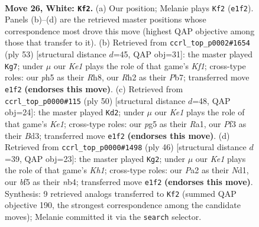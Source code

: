 \documentclass[11pt]{article}
\begin{document}
\clearpage

\begin{figure}[p]\centering
\begin{subfigure}{0.46\textwidth}\centering
\resizebox{\linewidth}{!}{%
\newchessgame
\chessboard[
  setfen={r1k3nN/3n4/8/pp2pbpp/8/5P1P/P5PR/2b1K3 w - - 0 26},
  showmover=false,
  pgfstyle=straightmove, color=movearrow, markmove={e1-f2}
]}
\caption{}
\end{subfigure}\hfill
\begin{subfigure}{0.46\textwidth}\centering
\resizebox{\linewidth}{!}{%
\newchessgame
\chessboard[
  setfen={5k1r/1p1Ppp2/p1p5/2P4p/2B2b2/7P/PPK2P2/7R b - - 1 27},
  showmover=false,
  pgfstyle=straightmove, color=movearrow, markmove={f8-g7}
]}
\caption{}
\end{subfigure}
\\[4pt]
\begin{subfigure}{0.46\textwidth}\centering
\resizebox{\linewidth}{!}{%
\newchessgame
\chessboard[
  setfen={r4b2/2k2p2/2p2p1p/p1P5/P1NP4/3BP2b/8/R3K3 w Q - 1 26},
  showmover=false,
  pgfstyle=straightmove, color=movearrow, markmove={e1-d2}
]}
\caption{}
\end{subfigure}\hfill
\begin{subfigure}{0.46\textwidth}\centering
\resizebox{\linewidth}{!}{%
\newchessgame
\chessboard[
  setfen={1r6/p3bpp1/2p1k3/4p3/1nP5/1P3PP1/P3P3/R1BN3K w - - 1 24},
  showmover=false,
  pgfstyle=straightmove, color=movearrow, markmove={h1-g2}
]}
\caption{}
\end{subfigure}
\caption{\textbf{Move 26, White: \texttt{Kf2}.} (a) Our position; Melanie plays \texttt{Kf2} (\texttt{e1f2}). Panels (b)--(d) are the retrieved master positions whose correspondence most drove this move (highest QAP objective among those that transfer to it). (b) Retrieved from \texttt{ccrl\_top\_p0002\#1654} (ply 53) [structural distance $d$=45, QAP obj=31]: the master played \texttt{Kg7}; under $\mu$ our \emph{Ke1} plays the role of that game's \emph{Kf1}; cross-type roles: our \emph{p}h5 as their \emph{R}h8, our \emph{R}h2 as their \emph{P}b7; transferred move \texttt{e1f2} \textbf{(endorses this move)}. (c) Retrieved from \texttt{ccrl\_top\_p0000\#115} (ply 50) [structural distance $d$=48, QAP obj=24]: the master played \texttt{Kd2}; under $\mu$ our \emph{Ke1} plays the role of that game's \emph{Ke1}; cross-type roles: our \emph{p}g5 as their \emph{R}a1, our \emph{P}f3 as their \emph{B}d3; transferred move \texttt{e1f2} \textbf{(endorses this move)}. (d) Retrieved from \texttt{ccrl\_top\_p0000\#1498} (ply 46) [structural distance $d$=39, QAP obj=23]: the master played \texttt{Kg2}; under $\mu$ our \emph{Ke1} plays the role of that game's \emph{Kh1}; cross-type roles: our \emph{P}a2 as their \emph{N}d1, our \emph{b}f5 as their \emph{n}b4; transferred move \texttt{e1f2} \textbf{(endorses this move)}. Synthesis: 9 retrieved analogs transferred to \texttt{Kf2} (summed QAP objective 190, the strongest correspondence among the candidate moves); Melanie committed it via the \texttt{search} selector.}
\label{fig:thought-m50}
\end{figure}
\end{document}
